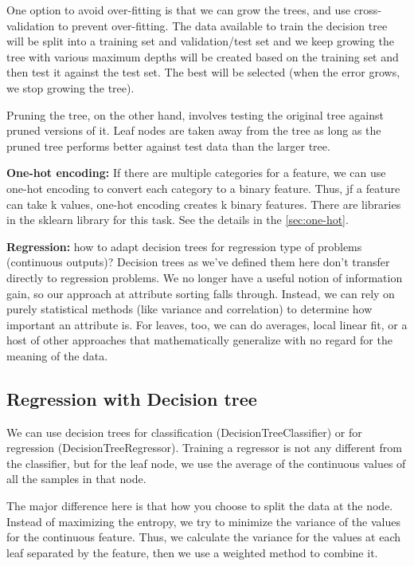 \documentclass[12pt]{report}
\begin{document}
One option to avoid over-fitting is that we can grow the trees, and use cross-validation to prevent over-fitting. The data available to train the decision tree will be split into a training set and validation/test set and we keep growing the tree with various maximum depths will be created based on the training set and then test it against the test set. The best will be selected (when the error grows, we stop growing the tree).

Pruning the tree, on the other hand, involves testing the original tree against pruned versions of it. Leaf nodes are taken away from the tree as long as the pruned tree performs better against test data than the larger tree.


\textbf{One-hot encoding:} If there are multiple categories for a feature, we can use one-hot encoding to convert each category to a binary feature. Thus, jf a feature can take k values, one-hot encoding creates k binary features. There are libraries in the sklearn library for this task. See the details in the \ref{sec:one-hot}.

\textbf{Regression:} how to adapt decision trees for regression type of problems (continuous outputs)? Decision trees as we’ve defined them here don’t transfer directly to regression problems. We no longer have a useful notion of information gain, so our approach at attribute sorting falls through. Instead, we can rely on purely statistical methods (like variance and correlation) to determine how important an attribute is. For leaves, too, we can do averages, local linear fit, or a host of other approaches that mathematically generalize with no regard for the meaning of the data.

\subsection{Regression with Decision tree}

We can use decision trees for classification (DecisionTreeClassifier) or for regression (DecisionTreeRegressor). Training a regressor is not any different from the classifier, but for the leaf node, we use the average of the continuous values of all the samples in that node.

The major difference here is that how you choose to split the data at the node. Instead of maximizing the entropy, we try to minimize the variance of the values for the continuous feature. Thus, we calculate the variance for the values at each leaf separated by the feature, then we use a weighted method to combine it.
\end{document}
